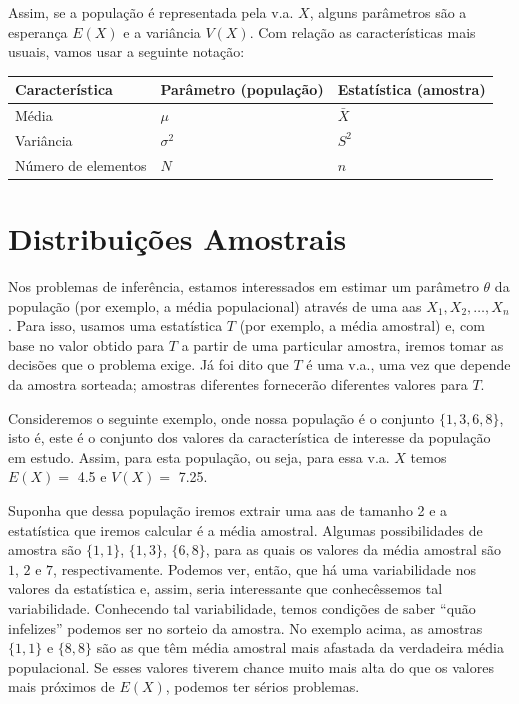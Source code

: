 \documentclass[
]{book}
\begin{document}
Assim, se a população é representada pela v.a. \(X\), alguns parâmetros são a esperança \(E(X)\) e a variância \(V(X)\). Com relação as características mais usuais, vamos usar a seguinte notação:

\begin{longtable}[]{@{}lll@{}}
\toprule
Característica & Parâmetro (população) & Estatística (amostra) \\
\midrule
\endhead
Média & \(\mu\) & \(\bar X\) \\
Variância & \(\sigma^2\) & \(S^2\) \\
Número de elementos & \(N\) & \(n\) \\
\bottomrule
\end{longtable}

\hypertarget{distribuiuxe7uxf5es-amostrais}{%
\section{Distribuições Amostrais}\label{distribuiuxe7uxf5es-amostrais}}

Nos problemas de inferência, estamos interessados em estimar um parâmetro \(\theta\) da população (por exemplo, a média populacional) através de uma aas \(X_1, X_2, \ldots, X_n\). Para isso, usamos uma estatística \(T\) (por exemplo, a média amostral) e, com base no valor obtido para \(T\) a partir de uma particular amostra, iremos tomar as decisões que o problema exige. Já foi dito que \(T\) é uma v.a., uma vez que depende da amostra sorteada; amostras diferentes fornecerão diferentes valores para \(T\).

Consideremos o seguinte exemplo, onde nossa população é o conjunto \(\{1,3,6,8\}\), isto é, este é o conjunto dos valores da característica de interesse da população em estudo. Assim, para esta população, ou seja, para essa v.a. \(X\) temos \(E(X)=\) 4.5 e \(V(X)=\) 7.25.

Suponha que dessa população iremos extrair uma aas de tamanho 2 e a estatística que iremos calcular é a média amostral. Algumas possibilidades de amostra são \(\{1,1\}\), \(\{1,3\}\), \(\{6,8\}\), para as quais os valores da média amostral são \(1\), \(2\) e \(7\), respectivamente. Podemos ver, então, que há uma variabilidade nos valores da estatística e, assim, seria interessante que conhecêssemos tal variabilidade. Conhecendo tal variabilidade, temos condições de saber ``quão infelizes'' podemos ser no sorteio da amostra. No exemplo acima, as amostras \(\{1,1\}\) e \(\{8,8\}\) são as que têm média amostral mais afastada da verdadeira média populacional. Se esses valores tiverem chance muito mais alta do que os valores mais próximos de \(E(X)\), podemos ter sérios problemas.
\end{document}
